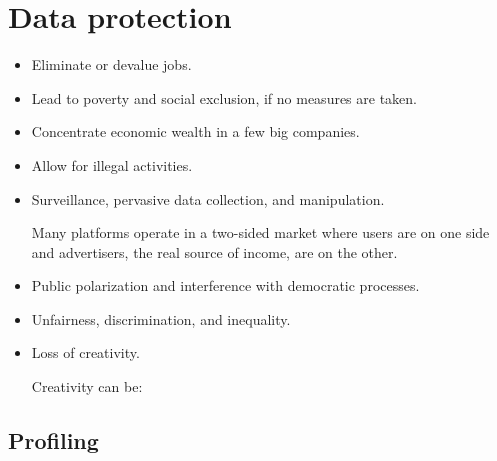 \chapter{Data protection}

\begin{remark}[AI risks] \phantom{}
    \begin{itemize}
        \item Eliminate or devalue jobs.
        \item Lead to poverty and social exclusion, if no measures are taken.
        \item Concentrate economic wealth in a few big companies.
        \item Allow for illegal activities.
        \item Surveillance, pervasive data collection, and manipulation.
            \begin{example}
                Many platforms operate in a two-sided market where users are on one side and advertisers, the real source of income, are on the other.
            \end{example}
        \item Public polarization and interference with democratic processes.
        \item Unfairness, discrimination, and inequality.
        \item Loss of creativity.
            \begin{remark}
                Creativity can be:
            \end{remark}
    \end{itemize}
\end{remark}



\section{Profiling}

